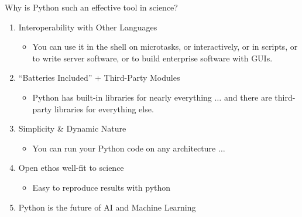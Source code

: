\documentclass{bredelebeamer}
\begin{document}
\begin{frame}{Why is Python such an effective tool in
science?}
\begin{enumerate}
	\item Interoperability with Other Languages
	\begin{itemize}
		\item You can use it in the shell on microtasks, or interactively, or in scripts, or to write server software, or to build enterprise software with GUIs.
	\end{itemize}	
	\item “Batteries Included” + Third-Party Modules
	\begin{itemize}
		\item Python has built-in libraries for nearly everything $\ldots$ and there are third-party
libraries for everything else.
	\end{itemize}	
	\item Simplicity \& Dynamic Nature
	\begin{itemize}
		\item  You can run your Python code on any architecture $\ldots$
	\end{itemize}	
	\item Open ethos well-fit to science
	\begin{itemize}
		\item Easy to reproduce results with python
	\end{itemize}
	\item Python is the future of AI and Machine Learning	
\end{enumerate}	
\end{frame}
\end{document}
